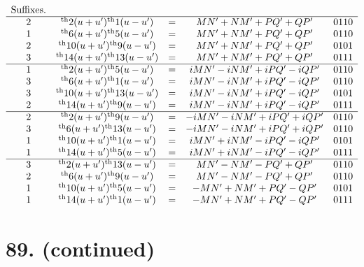 \documentclass[11pt,a4paper]{book}
\providecommand{\uth}{\textsuperscript{th}}
\begin{document}
\[
\begin{array}{ccccc}
\text{Suffixes.} & & & & \\
\hline
2 & \uth{2}(u+u')\uth{1}(u-u') &=& MN' + NM' + PQ' + QP' & 0110 \\
1 & \uth{6}(u+u')\uth{5}(u-u') &=& MN' + NM' + PQ' + QP' & 0110 \\
2 & \uth{10}(u+u')\uth{9}(u-u') &=& MN' + NM' + PQ' + QP' & 0101 \\
3 & \uth{14}(u+u')\uth{13}(u-u') &=& MN' + NM' + PQ' + QP' & 0111 \\
\hline
1 & \uth{2}(u+u')\uth{5}(u-u') &=& iMN' - iNM' + iPQ' - iQP' & 0110 \\
3 & \uth{6}(u+u')\uth{1}(u-u') &=& iMN' - iNM' + iPQ' - iQP' & 0110 \\
3 & \uth{10}(u+u')\uth{13}(u-u') &=& iMN' - iNM' + iPQ' - iQP' & 0101 \\
2 & \uth{14}(u+u')\uth{9}(u-u') &=& iMN' - iNM' + iPQ' - iQP' & 0111 \\
\hline
2 & \uth{2}(u+u')\uth{9}(u-u') &=& -iMN' - iNM' + iPQ' + iQP' & 0110 \\
3 & \uth{6}(u+u')\uth{13}(u-u') &=& -iMN' - iNM' + iPQ' + iQP' & 0110 \\
1 & \uth{10}(u+u')\uth{1}(u-u') &=& iMN' + iNM' - iPQ' - iQP' & 0101 \\
1 & \uth{14}(u+u')\uth{5}(u-u') &=& iMN' + iNM' - iPQ' - iQP' & 0111 \\
\hline
3 & \uth{2}(u+u')\uth{13}(u-u') &=& MN' - NM' - PQ' + QP' & 0110 \\
2 & \uth{6}(u+u')\uth{9}(u-u') &=& MN' - NM' - PQ' + QP' & 0110 \\
1 & \uth{10}(u+u')\uth{5}(u-u') &=& -MN' + NM' + PQ' - QP' & 0101 \\
1 & \uth{14}(u+u')\uth{1}(u-u') &=& -MN' + NM' + PQ' - QP' & 0111
\end{array}
\]

\newpage
\section*{89. (continued)}
\label{sec:89cont2}
\end{document}
